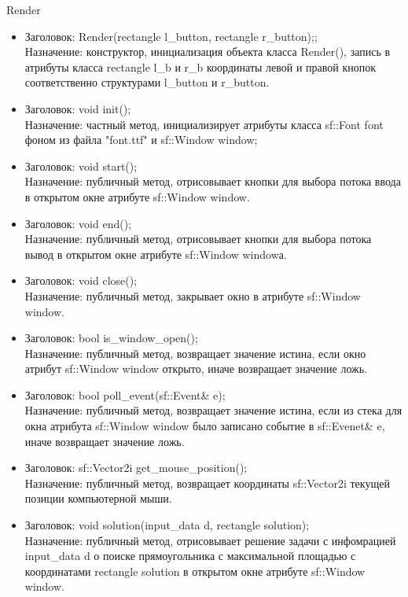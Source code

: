 \documentclass[12pt,a4paper]{article}
\begin{document}
{\begin{center}
Render
\end{center}
\begin{itemize}
\item Заголовок: Render(rectangle l\_button, rectangle r\_button);; \\
Назначение: конструктор, инициализация объекта класса Render(), запись в атрибуты класса rectangle l\_b и r\_b координаты левой и правой кнопок соответственно структурами l\_button и r\_button.
\item Заголовок: void init();\\
Назначение: частный метод, инициализирует атрибуты класса sf::Font font фоном из файла "font.ttf" и sf::Window window;
\item Заголовок: void start();\\
Назначение: публичный метод, отрисовывает кнопки для выбора потока ввода в открытом окне атрибуте sf::Window window.
\item Заголовок: void end(); \\
Назначение: публичный метод, отрисовывает кнопки для выбора потока вывод в открытом окне атрибуте sf::Window windowа.
\item Заголовок: void close(); \\
Назначение: публичный метод, закрывает окно в атрибуте sf::Window window.
\item Заголовок: bool is\_window\_open(); \\
Назначение: публичный метод, возвращает значение истина, если окно атрибут sf::Window window открыто, иначе возвращает значение ложь.
\item Заголовок: bool poll\_event(sf::Event\& e); \\
Назначение: публичный метод, возвращает значение истина, если из стека для окна атрибута sf::Window window было записано событие в sf::Evenet\& e, иначе возвращает значение ложь.
\item Заголовок: sf::Vector2i get\_mouse\_position(); \\
Назначение: публичный метод, возвращает координаты sf::Vector2i текущей позиции компьютерной мыши.
\item Заголовок: void solution(input\_data d, rectangle solution); \\
Назначение: публичный метод, отрисовывает решение задачи с инфомрацией input\_data d о поиске прямоугольника с максимальной площадью с координатами rectangle solution в открытом окне атрибуте sf::Window window.
\end{itemize}

}
\end{document}
